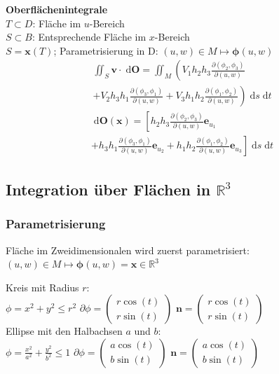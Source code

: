 \documentclass[6pt,a4paper]{scrartcl}
\newcommand{\vect}[1]{\ensuremath{\begin{pmatrix} #1 \end{pmatrix}}}							%
\renewcommand{\vec}[1]{\ensuremath{\boldsymbol {#1}}}											%
\renewcommand{\emph}[1]{\textbf{#1}}															%
\newcommand{\diff}{\ensuremath{\;\mathrm d}}									%
\newcommand{\R}{\ensuremath{\mathbb R}}
\begin{document}
\begin{multicols*}{4}
\emph{Oberflächenintegrale}\\
$T \subset D$: Fläche im $u$-Bereich\\
$S \subset B$: Entsprechende Fläche im $x$-Bereich\\
$S = \vec{x}(T)$; Parametrisierung in D: $(u,w) \in M \mapsto \vec{\phi}(u,w)$
\begin{gather*}
\iint_S{\vec{v} \cdot \diff\vec{O}} = \iint_M\left(V_1 h_2 h_3 \frac{\partial(\phi_2,\phi_3)}{\partial(u,w)}\right.\\ \left.+ V_2 h_3 h_1 \frac{\partial(\phi_3,\phi_1)}{\partial(u,w)} + V_3 h_1 h_2 \frac{\partial(\phi_1,\phi_2)}{\partial(u,w)}\right) \diff s \diff t
\end{gather*}
\begin{gather*}
\diff\vec{O}(\vec{x}) = \left[h_2 h_3 \frac{\partial(\phi_2,\phi_3)}{\partial(u,w)}\vec{e}_{u_1}\right.\\ \left. + h_3 h_1 \frac{\partial(\phi_3,\phi_1)}{\partial(u,w)}\vec{e}_{u_2} + h_1 h_2 \frac{\partial(\phi_1,\phi_2)}{\partial(u,w)}\vec{e}_{u_3}\right] \diff s \diff t
\end{gather*}

\subsection{Integration über Flächen in $\R^3$}

\subsubsection{Parametrisierung}
Fläche im Zweidimensionalen wird zuerst parametrisiert:\\
$(u,w) \in M \mapsto \vec{\phi}(u,w) = \vec{x} \in \R^3$

Kreis mit Radius $r$:\\
$\phi = x^2 + y^2 \le r^2$ \qquad $\partial \phi = \vect{r \cos(t)\\ r \sin(t)}$ \quad $\vec n = \vect{r \cos(t)\\ r \sin(t)}$\\[0.5em]
Ellipse mit den Halbachsen $a$ und $b$:\\
$\phi = \frac{x^2}{a^2} + \frac{y^2}{b^2} \le 1$ \qquad $\partial \phi = \vect{ a \cos(t) \\  b \sin(t)}$ \quad $\vec n = \vect{ a \cos(t) \\ b \sin(t)}$


\end{multicols*}
\end{document}
